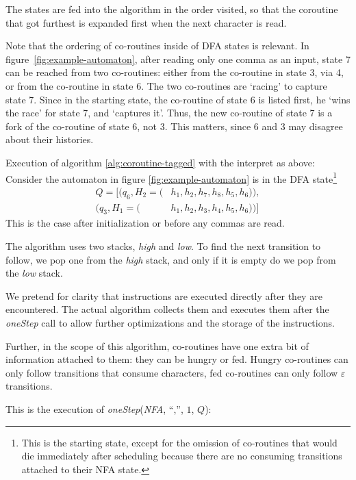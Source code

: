\documentclass[11pt,a4paper,twoside,openright]{Thesis}
\theoremstyle{definition}
\newcommand{\Figref}[1]{figure~\ref{fig:#1}}
\begin{document}
The states are fed into the algorithm in the order visited, so that the 
coroutine that got furthest is expanded first when the next character is 
read.

Note that the ordering of co-routines inside of DFA states is relevant.
In \Figref{example-automaton}, after reading only one comma as an
input, state 7 can be reached from two co-routines: either from the
co-routine in state 3, via 4, or from the co-routine in state 6. The two
co-routines are `racing' to capture state 7. Since in the starting
state, the co-routine of state 6 is listed first, he `wins the race'
for state 7, and `captures it'. Thus, the new co-routine of state 7 is
a fork of the co-routine of state 6, not 3. This matters, since 6 and
3 may disagree about their histories.

\begin{example} Execution of algorithm \ref{alg:coroutine-tagged} with the 
  interpret as above: \label{ex:oneStep1}
Consider the automaton in figure \ref{fig:example-automaton} is in
the DFA state\footnote{This is the starting state, except for the omission of
co-routines that would die immediately after scheduling because there are no
consuming transitions attached to their NFA state.}
\begin{align*}
Q=[
	(q_6, H_2=(&h_1, h_2, h_7,  h_8, h_5, h_6)), \\
	(q_3, H_1=(&h_1, h_2, h_3,  h_4, h_5, h_6))]
	\end{align*}
This is the case after initialization or before any commas are read.

The algorithm uses two stacks, \emph{high} and \emph{low}.
To find the next transition to follow, we pop one from the \emph{high} stack,
and only if it is empty do we pop from the \emph{low} stack.

We pretend for clarity that instructions are executed directly
after they are encountered.  The actual algorithm collects them and
executes them after the \emph{oneStep} call to allow further
optimizations and the storage of the instructions.

Further, in the scope of this algorithm, co-routines have one extra bit of
information attached to them: they can be hungry or fed. Hungry co-routines can
only follow transitions that consume characters, fed co-routines can only
follow $\varepsilon$ transitions.

This is the execution of \emph{oneStep}(\emph{NFA},
``,'', $1$, $Q$):


\end{example}
\end{document}
